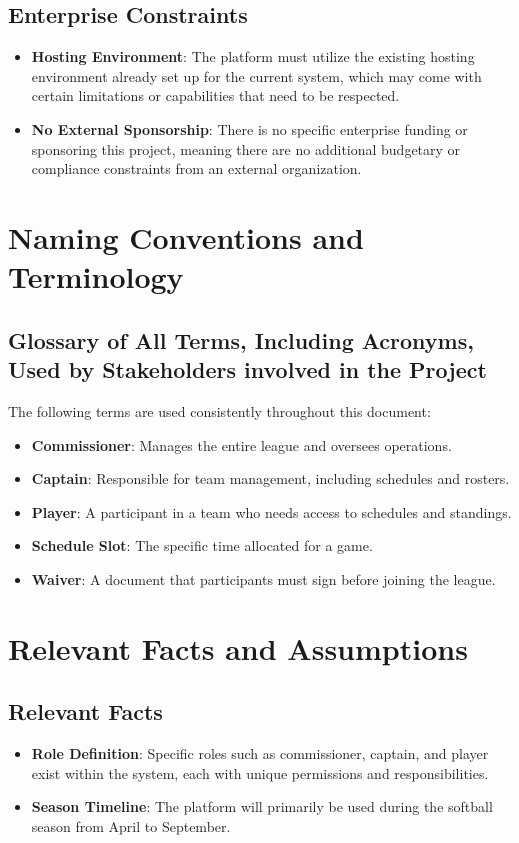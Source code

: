 \documentclass[12pt]{article}
\begin{document}
\subsection{Enterprise Constraints}
\begin{itemize}
    \item \textbf{Hosting Environment}: The platform must utilize the existing hosting environment already set up for the current system, which may come with certain limitations or capabilities that need to be respected.
    \item \textbf{No External Sponsorship}: There is no specific enterprise funding or sponsoring this project, meaning there are no additional budgetary or compliance constraints from an external organization.
\end{itemize}

\section{Naming Conventions and Terminology}

\subsection{Glossary of All Terms, Including Acronyms, Used by Stakeholders involved in the Project}
The following terms are used consistently throughout this document:
\begin{itemize}
    \item \textbf{Commissioner}: Manages the entire league and oversees operations.
    \item \textbf{Captain}: Responsible for team management, including schedules and rosters.
    \item \textbf{Player}: A participant in a team who needs access to schedules and standings.
    \item \textbf{Schedule Slot}: The specific time allocated for a game.
    \item \textbf{Waiver}: A document that participants must sign before joining the league.
\end{itemize}

\section{Relevant Facts and Assumptions}

\subsection{Relevant Facts}
\begin{itemize}
    \item \textbf{Role Definition}: Specific roles such as commissioner, captain, and player exist within the system, each with unique permissions and responsibilities.
    \item \textbf{Season Timeline}: The platform will primarily be used during the softball season from April to September.
\end{itemize}
\end{document}
